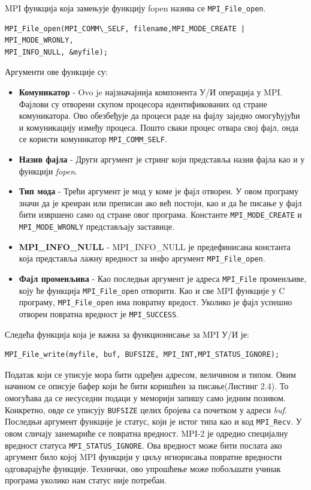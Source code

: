 MPI функција која замењује функцију fopen назива се \texttt{MPI\_File\_open}.

\begin{verbatim}
MPI_File_open(MPI_COMM\_SELF, filename,MPI_MODE_CREATE | MPI_MODE_WRONLY,
MPI_INFO_NULL, &myfile);
\end{verbatim}

Аргументи ове функције су:

\begin{itemize}
\item \textbf{Комуникатор} - Ovo je најзначајнија компонента У/И операција у MPI. Фајлови су отворени скупом процесора идентификованих од стране комуникатора. 
Ово обезбеђује да процеси раде на фајлу заједно омогућујући и комуникацију између процеса. 
Пошто сваки процес отвара свој фајл, онда се користи комуникатор \texttt{MPI\_COMM\_SELF}.

\item \textbf{Назив фајла} - Други аргумент је стринг који представља назив фајла као и у функцији \textit{fopen}.

\item \textbf{Тип мода} - Трећи аргумент је мод у коме је фајл отворен. У овом програму значи да је креиран или преписан ако већ постоји, као и да ће писање у фајл бити извршено само од стране овог програма. Константе  \texttt{MPI\_MODE\_CREATE} и \texttt{MPI\_MODE\_WRONLY} представљају заставице.

\item  \textbf{MPI\_INFO\_NULL} - MPI\_INFO\_NULL је предефинисана константа која представља лажну вредност за инфо аргумент \texttt{MPI\_File\_open}. 

\item \textbf{Фајл променљива} - Као последњи аргумент је адреса \texttt{MPI\_File} променљиве, коју ће функција \texttt{MPI\_File\_open} отворити. Као и све MPI функције у C програму, \texttt{MPI\_File\_open} има повратну вредост. Уколико је фајл успешно отворен повратна вредност је \texttt{MPI\_SUCCESS}.

\end{itemize}
 
Следећа функција која је важна за функционисање за MPI У/И је:

 \begin{verbatim}
MPI_File_write(myfile, buf, BUFSIZE, MPI_INT,MPI_STATUS_IGNORE);
\end{verbatim}

Податак који се уписује мора бити одређен адресом, величином и типом. Овим начином се описује бафер који ће бити коришћен за писање(Листинг 2.4). То омогућава да се несуседни подаци у меморији запишу само једним позивом. Конкретно, овде се уписују 
\texttt{BUFSIZE} целих бројева са почетком у адреси \textit{buf}. Последњи аргумент функције је статус, који је истог типа као и код \texttt{MPI\_Recv}.
У овом сличају занемариће се повратна вредност. MPI-2 је одредио специјалну вредност статуса \texttt{MPI\_STATUS\_IGNORE}. Ова вредност може бити послата ако аргумент било којој MPI функцији у циљу игнорисања повратне вредности одговарајуће функције.
Технички, ово упрошћење може побољшати учинак програма уколико нам статус није потребан.

